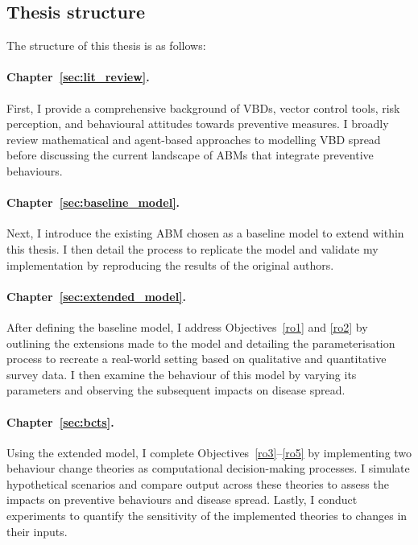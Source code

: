 \clearpage
\subsection{Thesis structure}

The structure of this thesis is as follows:

\paragraph{Chapter~\ref{sec:lit_review}.} First, I provide a comprehensive background of VBDs, vector control tools, risk perception, and behavioural attitudes towards preventive measures. I broadly review mathematical and agent-based approaches to modelling VBD spread before discussing the current landscape of ABMs that integrate preventive behaviours.

\paragraph{Chapter~\ref{sec:baseline_model}.} Next, I introduce the existing ABM chosen as a baseline model to extend within this thesis. I then detail the process to replicate the model and validate my implementation by reproducing the results of the original authors.

\paragraph{Chapter~\ref{sec:extended_model}.} After defining the baseline model, I address Objectives~\ref{ro1} and \ref{ro2} by outlining the extensions made to the model and detailing the parameterisation process to recreate a real-world setting based on qualitative and quantitative survey data. I then examine the behaviour of this model by varying its parameters and observing the subsequent impacts on disease spread.

\paragraph{Chapter~\ref{sec:bcts}.} Using the extended model, I complete Objectives~\ref{ro3}--\ref{ro5} by implementing two behaviour change theories as computational decision-making processes. I simulate hypothetical scenarios and compare output across these theories to assess the impacts on preventive behaviours and disease spread. Lastly, I conduct experiments to quantify the sensitivity of the implemented theories to changes in their inputs.

